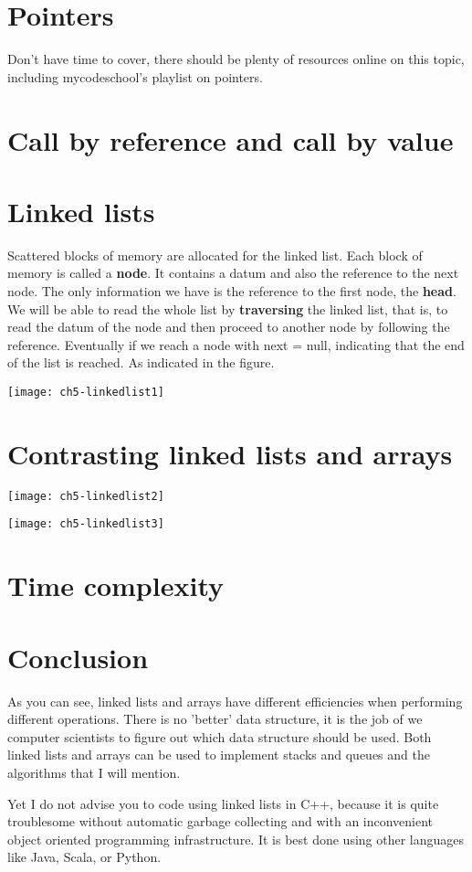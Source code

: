 \section{Pointers}

Don't have time to cover, there should be plenty of resources online on this topic, including mycodeschool's playlist on pointers.

\section{Call by reference and call by value}



\section{Linked lists}

Scattered blocks of memory are allocated for the linked list. Each block of memory is called a \textbf{node}. It contains a datum and also the reference to the next node. The only information we have is the reference to the first node, the \textbf{head}. We will be able to read the whole list by \textbf{traversing} the linked list, that is, to read the datum of the node and then proceed to another node by following the reference. Eventually if we reach a node with next = null, indicating that the end of the list is reached. As indicated in the figure.

\texttt{[image: ch5-linkedlist1]}

\section{Contrasting linked lists and arrays}

\texttt{[image: ch5-linkedlist2]}

\texttt{[image: ch5-linkedlist3]}

\section{Time complexity}



\section{Conclusion}
As you can see, linked lists and arrays have different efficiencies when performing different operations. There is no 'better' data structure, it is the job of we computer scientists to figure out which data structure should be used. Both linked lists and arrays can be used to implement stacks and queues and the algorithms that I will mention. 

Yet I do not advise you to code using linked lists in C++, because it is quite troublesome without automatic garbage collecting and with an inconvenient object oriented programming infrastructure. It is best done using other languages like Java, Scala, or Python.

